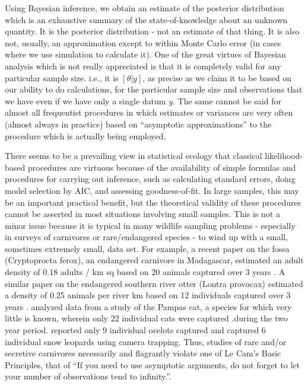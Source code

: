 Using Bayesian inference, we obtain an estimate of the posterior
distribution which is an exhaustive summary of the state-of-knowledge
about an unknown quantity. It is the posterior distribution - not an
estimate of that thing. It is also not, usually, an approximation
except to within Monte Carlo error (in cases where we use simulation
to calculate it).  One of the great virtues of Bayesian analysis which
is not really appreciated is that it is completely valid for any
particular sample size. i.e., it is $[\theta|y]$, as precise as we
claim it to be based on our ability to do calculations, for the
particular sample size and observations that we have even if we have
only a single datum $y$.  The same cannot be said for almost all
frequentist procedures in which estimates or variances are very often
(almost always in practice) based on ``asymptotic approximations'' to
the procedure which is actually being employed.

There seems to be a prevailing view in statistical ecology that
classical likelihood-based procedures are virtuous because of the
availability of simple formulas and procedures for carrying out
inference, such as calculating standard errors, doing model selection
by AIC, and assessing goodness-of-fit.  In large samples, this may be
an important practical benefit, but the theoretical validity of these
procedures cannot be asserted in most situations involving small
samples.  This is not a minor issue because it is typical in many
wildlife sampling problems - especially in surveys of carnivores or
rare/endangered species - to wind up with a small, sometimes extremely
small, data set. For example, a recent paper on the fossa
(Cryptoprocta ferox), an endangered carnivore in Madagascar, estimated
an adult density of 0.18 adults / km sq based on 20 animals captured
over 3 years \citep{hawkins_racey:2005}. A similar paper on the
endangered southern river otter (Lontra provocax) estimated a density
of 0.25 animals per river km based on 12 individuals captured over 3
years \citep{sepulveda_etal:2007}. \citet{gardner_etal:2010} analyzed
data from a study of the Pampas cat, a species for which very little
is known, wherein only 22 individual cats were captured .during the
two year period.  \citet{trolle_kery:2005} reported only 9 individual
ocelots captured and \citet{jackson_etal:2006} captured 6 individual
snow leopards using camera trapping. Thus, studies of rare and/or
secretive carnivores necessarily and flagrantly violate one of Le
Cam's Basic Principles, that of ``If you need to use asymptotic
arguments, do not forget to let your number of observations tend to
infinity.''\citep{lecam:1990}.

